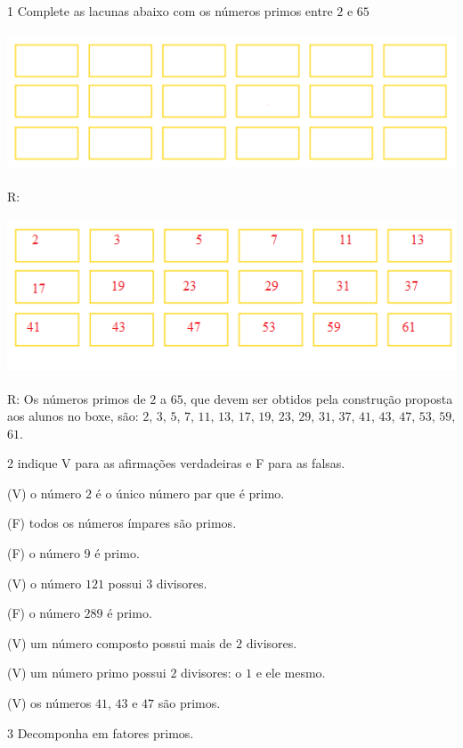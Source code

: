 
\num{1}  Complete as lacunas abaixo com os números primos entre $2$ e $65$


\includegraphics[width=5.54167in,height=1.625in]{./imgSAEB_6_MAT/media/image9.png}

R:

\includegraphics[width=5.47708in,height=1.81389in]{./imgSAEB_6_MAT/media/image10.png}

R: Os números primos de $2$ a $65$, que devem ser obtidos pela construção
proposta aos alunos no boxe, são: $2$, $3$, $5$, $7$, $11$, $13$, $17$, $19$, $23$, $29$,
$31$, $37$, $41$, $43$, $47$, $53$, $59$, $61$.

\num{2}  indique V para as afirmações verdadeiras e F para as falsas.

(V) o número $2$ é o único número par que é primo.

(F) todos os números ímpares são primos.

(F) o número $9$ é primo.

(V) o número $121$ possui $3$ divisores.

(F) o número $289$ é primo.

(V) um número composto possui mais de $2$ divisores.

(V) um número primo possui $2$ divisores: o $1$ e ele mesmo.

(V) os números $41$, $43$ e $47$ são primos.

\num{3}  Decomponha em fatores primos.

